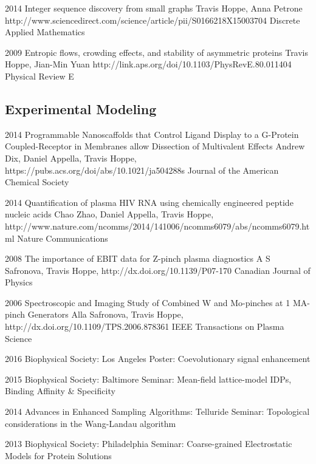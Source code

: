 \documentclass[]{scrartcl}
\begin{document}
\begin{cleanCV}
\Paper
{2014}
{Integer sequence discovery from small graphs}
{Travis Hoppe, Anna Petrone}
{http://www.sciencedirect.com/science/article/pii/S0166218X15003704}
{Discrete Applied Mathematics}

\Paper
{2009}
{Entropic flows, crowding effects, and stability of asymmetric proteins}
{Travis Hoppe, Jian-Min Yuan}
{http://link.aps.org/doi/10.1103/PhysRevE.80.011404}
{Physical Review E}


\subsection{Experimental Modeling}

\Paper
{2014}
{Programmable Nanoscaffolds that Control Ligand Display to a G-Protein Coupled-Receptor in Membranes allow Dissection of Multivalent Effects}
{Andrew Dix, Daniel Appella, Travis Hoppe, \etal}
{https://pubs.acs.org/doi/abs/10.1021/ja504288s}
{Journal of the American Chemical Society}

\Paper
{2014}
{Quantification of plasma HIV RNA using chemically engineered peptide nucleic acids}
{Chao Zhao, Daniel Appella, Travis Hoppe, \etal}
{http://www.nature.com/ncomms/2014/141006/ncomms6079/abs/ncomms6079.html}
{Nature Communications}

\Paper
{2008}
{The importance of EBIT data for Z-pinch plasma diagnostics}
{A S Safronova, Travis Hoppe, \etal}
{http://dx.doi.org/10.1139/P07-170}
{Canadian Journal of Physics}

\Paper
{2006}
{Spectroscopic and Imaging Study of Combined W and Mo-pinches 
  at 1 MA-pinch Generators}
{Alla Safronova, Travis Hoppe, \etal}
{http://dx.doi.org/10.1109/TPS.2006.878361}
{IEEE Transactions on Plasma Science}


\WorkExperienceX
{2016}
{Biophysical Society: Los Angeles}
{Poster: Coevolutionary signal enhancement}

\WorkExperienceX
{2015}
{Biophysical Society: Baltimore}
{Seminar: Mean-field lattice-model IDPs, Binding Affinity \& Specificity}

\WorkExperienceX
{2014}
{Advances in Enhanced Sampling Algorithms: Telluride}
{Seminar: Topological considerations in the Wang-Landau algorithm}

\WorkExperienceX
{2013}
{Biophysical Society: Philadelphia}
{Seminar: Coarse-grained Electrostatic Models for Protein Solutions}


\end{cleanCV}
\end{document}
